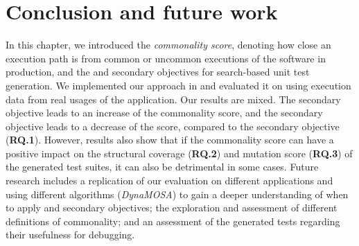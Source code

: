 

\section{Conclusion and future work}
\label{sec:cub:conclusion}

In this chapter, we introduced the \emph{commonality score}, denoting how close an execution path is from common or uncommon executions of the software in production, and the \com and \ucom secondary objectives for search-based unit test generation. 
We implemented our approach in \evosuite and evaluated it on \jabref using execution data from real usages of the application. 
Our results are mixed. The \com secondary objective leads to an increase of the commonality score, and the \ucom secondary objective leads to a decrease of the score, compared to the \df secondary objective (\textbf{RQ.1}).
However, results also show that if the commonality score can have a positive impact on the structural coverage (\textbf{RQ.2}) and mutation score (\textbf{RQ.3}) of the generated test suites, it can also be detrimental in some cases. 
Future research includes a replication of our evaluation on different applications and using different algorithms (\eg \textit{DynaMOSA}) to gain a deeper understanding of when to apply \com and \ucom secondary objectives; the exploration and assessment of different definitions of commonality; and an assessment of the generated tests regarding their usefulness for debugging. 



